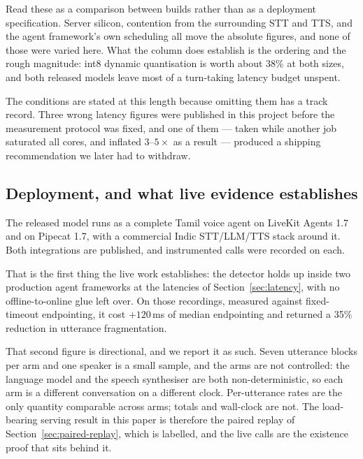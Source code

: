 \documentclass[11pt]{article}
\newcommand{\pct}{\%}
\begin{document}
Read these as a comparison between builds rather than as a deployment
specification. Server silicon, contention from the surrounding STT and TTS, and
the agent framework's own scheduling all move the absolute figures, and none of
those were varied here. What the column does establish is the ordering and the
rough magnitude: int8 dynamic quantisation is worth about 38\pct{} at both
sizes, and both released models leave most of a turn-taking latency budget
unspent.

The conditions are stated at this length because omitting them has a track
record. Three wrong latency figures were published in this project before the
measurement protocol was fixed, and one of them --- taken while another job
saturated all cores, and inflated $3$--$5\times$ as a result --- produced a
shipping recommendation we later had to withdraw.

\subsection{Deployment, and what live evidence establishes}

The released model runs as a complete Tamil voice agent on LiveKit Agents 1.7
and on Pipecat 1.7, with a commercial Indic STT/LLM/TTS stack around it. Both
integrations are published, and instrumented calls were recorded on each.

That is the first thing the live work establishes: the detector holds up inside
two production agent frameworks at the latencies of
Section~\ref{sec:latency}, with no offline-to-online glue left over. On those
recordings, measured against fixed-timeout endpointing, it cost $+120$\,ms of
median endpointing and returned a 35\pct{} reduction in utterance
fragmentation.

That second figure is directional, and we report it as such. Seven utterance
blocks per arm and one speaker is a small sample, and the arms are not
controlled: the language model and the speech synthesiser are both
non-deterministic, so each arm is a different conversation on a different clock.
Per-utterance rates are the only quantity comparable across arms; totals and
wall-clock are not. The load-bearing serving result in this paper is therefore
the paired replay of Section~\ref{sec:paired-replay}, which is labelled, and the
live calls are the existence proof that sits behind it.
\end{document}

